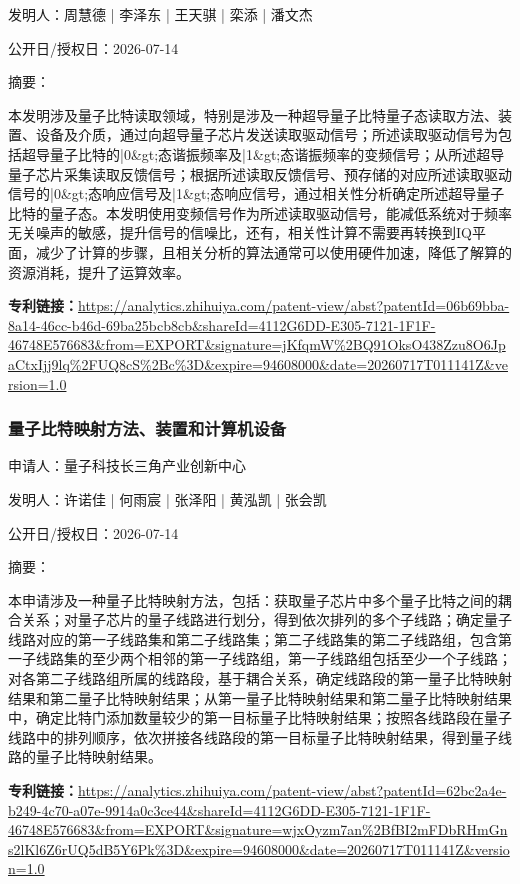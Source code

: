 \documentclass[12pt,a4paper]{ctexart}
\begin{document}
发明人：周慧德 | 李泽东 | 王天骐 | 栾添 | 潘文杰

公开日/授权日：2026-07-14

摘要：

本发明涉及量子比特读取领域，特别是涉及一种超导量子比特量子态读取方法、装置、设备及介质，通过向超导量子芯片发送读取驱动信号；所述读取驱动信号为包括超导量子比特的|0\&gt;态谐振频率及|1\&gt;态谐振频率的变频信号；从所述超导量子芯片采集读取反馈信号；根据所述读取反馈信号、预存储的对应所述读取驱动信号的|0\&gt;态响应信号及|1\&gt;态响应信号，通过相关性分析确定所述超导量子比特的量子态。本发明使用变频信号作为所述读取驱动信号，能减低系统对于频率无关噪声的敏感，提升信号的信噪比，还有，相关性计算不需要再转换到IQ平面，减少了计算的步骤，且相关分析的算法通常可以使用硬件加速，降低了解算的资源消耗，提升了运算效率。

\noindent\textbf{专利链接：}\url{https://analytics.zhihuiya.com/patent-view/abst?patentId=06b69bba-8a14-46cc-b46d-69ba25bcb8cb&shareId=4112G6DD-E305-7121-1F1F-46748E576683&from=EXPORT&signature=jKfqmW%2BQ91OksO438Zzu8O6JpaCtxIjj9lq%2FUQ8cS%2Bc%3D&expire=94608000&date=20260717T011141Z&version=1.0}

\subsubsection{ 量子比特映射方法、装置和计算机设备 }

申请人：量子科技长三角产业创新中心

发明人：许诺佳 | 何雨宸 | 张泽阳 | 黄泓凯 | 张会凯

公开日/授权日：2026-07-14

摘要：

本申请涉及一种量子比特映射方法，包括：获取量子芯片中多个量子比特之间的耦合关系；对量子芯片的量子线路进行划分，得到依次排列的多个子线路；确定量子线路对应的第一子线路集和第二子线路集；第二子线路集的第二子线路组，包含第一子线路集的至少两个相邻的第一子线路组，第一子线路组包括至少一个子线路；对各第二子线路组所属的线路段，基于耦合关系，确定线路段的第一量子比特映射结果和第二量子比特映射结果；从第一量子比特映射结果和第二量子比特映射结果中，确定比特门添加数量较少的第一目标量子比特映射结果；按照各线路段在量子线路中的排列顺序，依次拼接各线路段的第一目标量子比特映射结果，得到量子线路的量子比特映射结果。

\noindent\textbf{专利链接：}\url{https://analytics.zhihuiya.com/patent-view/abst?patentId=62bc2a4e-b249-4c70-a07e-9914a0c3ce44&shareId=4112G6DD-E305-7121-1F1F-46748E576683&from=EXPORT&signature=wjxOyzm7an%2BfBI2mFDbRHmGns2lKl6Z6rUQ5dB5Y6Pk%3D&expire=94608000&date=20260717T011141Z&version=1.0}
\end{document}
